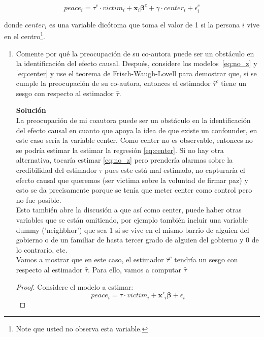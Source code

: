 \documentclass[a4paper, answers, addpoints, 11pt]{exam}
\begin{document}
    \begin{equation}\label{eq:center}
        peace_i = \tau^{c} \cdot victim_i + \textbf{x}_i\boldsymbol\beta^{c} + \gamma \cdot center_i + \epsilon^{c}_i
    \end{equation}

    donde $center_i$ es una variable dicótoma que toma el valor de 1 si la persona $i$ vive en el centro\footnote{Note que usted no observa esta variable.}. 

\begin{enumerate} [resume]
    \item Comente por qué la preocupación de su co-autora puede ser un obstáculo en la identificación del efecto causal. Después, considere los modelos~\eqref{eq:no_z} y \eqref{eq:center} y use el teorema de Frisch-Waugh-Lovell para demostrar que, si se cumple la preocupación de su co-autora, entonces el estimador $\hat\tau^c$ tiene un sesgo con respecto al estimador $\hat\tau$.

  \begin{mdframed}
        \textbf{Solución}\\
        La preocupación de mi coautora puede ser un obstáculo en la identificación del efecto causal en cuanto que apoya la idea de que existe un confounder, en este caso sería la variable center. Como center no es observable, entonces no se podría estimar la  estimar la regresión \eqref{eq:center}. Si no hay otra alternativa, tocaría estimar \ref{eq:no_z} pero prendería alarmas sobre la credibilidad del estimador $\tau$ pues este está mal estimado, no capturaría el efecto causal que queremos (ser victima sobre la voluntad de firmar paz) y esto se da precisamente porque se tenía que meter center como control pero no fue posible. \\
        Esto también abre la discusión a que así como center, puede haber otras variables que se están omitiendo, por ejemplo también incluir una variable dummy ('neighbhor') que sea 1 si se vive en el mismo barrio de alguien del gobierno o de un familiar de hasta tercer grado de alguien del gobierno y 0 de lo contrario, etc.\\
        
    Vamos a mostrar que en este caso, el estimador  $\hat\tau^c$ tendría un sesgo con respecto al estimador $\hat\tau$. Para ello, vamos a computar $\hat\tau$
    \begin{proof}
Considere el modelo a estimar:
\begin{equation*} 
    peace_i = \tau \cdot victim_i + \textbf{x}'_i\boldsymbol\beta + \epsilon_i
\end{equation*}


\end{proof}
\end{mdframed}
\end{enumerate}
\end{document}
